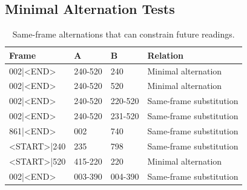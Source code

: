 \subsection{Minimal Alternation Tests}

\begin{table}[htbp]
\centering
\footnotesize
\begin{tabular}{llll}
\toprule
\textbf{Frame} & \textbf{A} & \textbf{B} & \textbf{Relation} \\
\midrule
002|<END> & 240-520 & 240 & Minimal alternation \\
002|<END> & 240-520 & 520 & Minimal alternation \\
002|<END> & 240-520 & 220-520 & Same-frame substitution \\
002|<END> & 240-520 & 231-520 & Same-frame substitution \\
861|<END> & 002 & 740 & Same-frame substitution \\
<START>|240 & 235 & 798 & Same-frame substitution \\
<START>|520 & 415-220 & 220 & Minimal alternation \\
002|<END> & 003-390 & 004-390 & Same-frame substitution \\
\bottomrule
\end{tabular}
\caption{Same-frame alternations that can constrain future readings.}
\end{table}
